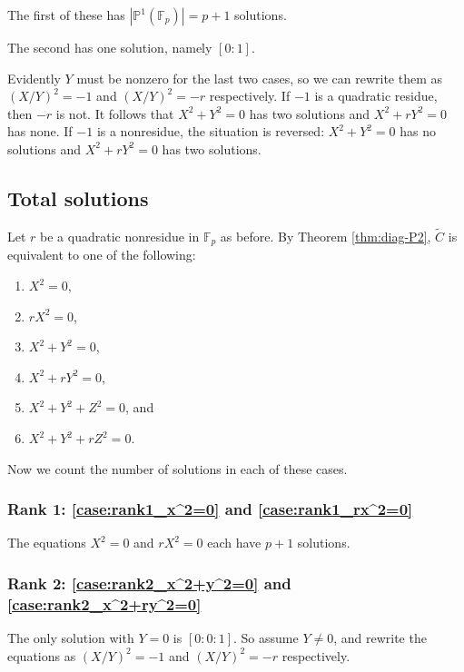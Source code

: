 \documentclass[10pt,a4paper]{amsart}
\numberwithin{equation}{section}
\numberwithin{figure}{section}
\theoremstyle{definition}
\theoremstyle{remark}
\theoremstyle{plain}
\theoremstyle{plain}
\theoremstyle{definition}
\theoremstyle{plain}
\theoremstyle{plain}
\renewcommand{\P}{\mathbb{P}}
\newcommand{\F}{\mathbb{F}}
\begin{document}
	The first of these has $|\P^1(\F_p)| = p+1$ solutions. 
	
	The second has one solution, namely $[0:1]$.
	
	Evidently $Y$ must be nonzero for the last two cases, so we can rewrite them as
	$(X/Y)^2 = -1$ and $(X/Y)^2 = -r$ respectively. If $-1$ is a quadratic residue,
	then $-r$ is not. It follows that $X^2 + Y^2 = 0$ has two solutions and $X^2 +
	rY^2 = 0$ has none. If $-1$ is a nonresidue, the situation is reversed: $X^2 +
	Y^2 = 0$ has no solutions and $X^2 + rY^2 = 0$ has two solutions.
	
	\subsection{Total solutions}
	\label{subsec:counting-P2-solutions}
	
	Let $r$ be a quadratic nonresidue in $\F_p$ as before. By Theorem \ref{thm:diag-P2}, $\widetilde{C}$ is equivalent to one of the following:
	\begin{enumerate} 
		\item\label{case:rank1_x^2=0} $X^2 = 0$,
		\item\label{case:rank1_rx^2=0} $rX^2 = 0$,
		\item\label{case:rank2_x^2+y^2=0} $X^2 + Y^2 = 0$, 
		\item\label{case:rank2_x^2+ry^2=0} $X^2 + rY^2 = 0$,
		\item\label{case:rank3_x^2+y^2+z^2=0} $X^2 + Y^2 + Z^2 = 0$, and 
		\item\label{case:rank3_x^2+y^2+rz^2=0} $X^2 + Y^2 + rZ^2 = 0$.  
	\end{enumerate}
	
	Now we count the number of solutions in each of these cases.
	
	\subsubsection*{Rank 1: \eqref{case:rank1_x^2=0} and \eqref{case:rank1_rx^2=0}} 
	The equations $X^2 = 0$ and $rX^2 = 0$ each have $p + 1$ solutions.
	
	\subsubsection*{Rank 2: \eqref{case:rank2_x^2+y^2=0} and \eqref{case:rank2_x^2+ry^2=0}} 
	The only solution with $Y=0$ is $[0:0:1]$. So assume $Y \neq 0$, and rewrite the 
	equations as $(X/Y)^2 = -1$ and $(X/Y)^2 = -r$ respectively.
	
\end{document}
